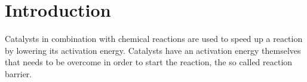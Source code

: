 
\chapter{Introduction}
\label{ch:Introduction}


Catalysts in combination with chemical reactions are used to speed up a reaction by lowering its activation energy. 
Catalysts have an activation energy themselves that needs to be overcome in order to start the reaction, the so called reaction barrier.

